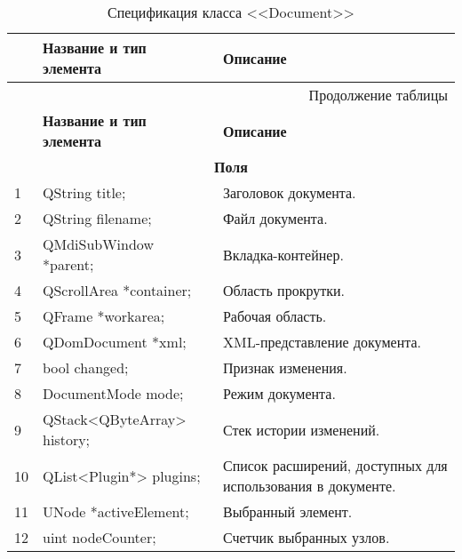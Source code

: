 \small
\singlespacing
\begin{longtable}[h]{|p{}|p{}|p{}|}
  \caption{Спецификация класса <<Document>>}
	\\ \hline
	  \textbf{\No}                  &
	  \textbf{Название и тип элемента}  &
	  \textbf{Описание}
	\\ \hline
  \endfirsthead

  \multicolumn{3}{r}{Продолжение таблицы \thetable{}}
  \\ \hline
	  \textbf{\No}                  &
	  \textbf{Название и тип элемента}  &
	  \textbf{Описание}
	\\ \hline
  \endhead

  \multicolumn{3}{|c|}{\textbf{Поля}} \\
  \hline
  1 & QString title; & Заголовок документа. \\ \hline
  2 & QString filename; & Файл документа. \\ \hline
  3 & QMdiSubWindow *parent; & Вкладка-контейнер. \\ \hline
  4 & QScrollArea *container; & Область прокрутки. \\ \hline
  5 & QFrame *workarea; & Рабочая область. \\ \hline
  6 & QDomDocument *xml; & XML-представление документа. \\ \hline
  7 & bool changed; & Признак изменения. \\ \hline
  8 & DocumentMode mode; & Режим документа. \\ \hline
  9 & QStack<QByteArray> history; & Стек истории изменений. \\ \hline
  10 & QList<Plugin*> plugins; & Список расширений, доступных для использования в документе. \\ \hline
  11 & UNode *activeElement; & Выбранный элемент. \\ \hline
  12 & uint nodeCounter; & Счетчик выбранных узлов. \\ \hline


\end{longtable}
